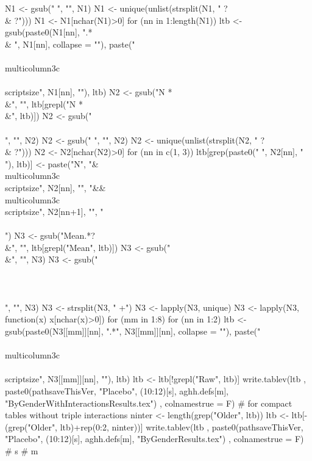 \begin{Schunk}
\begin{Sinput}
{{    N1 <- gsub(" ", "", N1)
    N1 <- unique(unlist(strsplit(N1, " ?\\& ?")))
    N1 <- N1[nchar(N1)>0]
    for (nn in 1:length(N1)) 
      ltb <- gsub(paste0(N1[nn], ".*\\& ", N1[nn], collapse = ""), 
        paste("\\\\multicolumn{3}{c}{\\\\scriptsize", N1[nn], "}"), ltb)
    N2 <- gsub("N *\\&", "", ltb[grepl("N *\\&", ltb)])
    N2 <- gsub("\\\\", "", N2)
    N2 <- gsub(" ", "", N2)
    N2 <- unique(unlist(strsplit(N2, " ?\\& ?")))
    N2 <- N2[nchar(N2)>0]
    for (nn in c(1, 3)) 
      ltb[grep(paste0(" ", N2[nn], " "), ltb)] <- 
        paste("N", "& \\multicolumn{3}{c}{\\scriptsize",  N2[nn], "}",
           "&& \\multicolumn{3}{c}{\\scriptsize",  N2[nn+1], "}", "\\\\")
    N3 <- gsub("Mean.*?\\&", "", ltb[grepl("Mean", ltb)])
    N3 <- gsub("\\&", "", N3)
    N3 <- gsub("\\\\\\\\", "", N3)
    N3 <- strsplit(N3, " +")
    N3 <- lapply(N3, unique)
    N3 <- lapply(N3, function(x) x[nchar(x)>0])
    for (mm in 1:8)
      for (nn in 1:2) 
        ltb <- gsub(paste0(N3[[mm]][nn], ".*", N3[[mm]][nn], collapse = ""), 
          paste("\\\\multicolumn{3}{c}{\\\\scriptsize", N3[[mm]][nn], "}"), ltb)
    ltb <- ltb[!grepl("Raw", ltb)]
    write.tablev(ltb
      ,  paste0(pathsaveThisVer, "Placebo", (10:12)[s], aghh.defs[m], "ByGenderWithInteractionsResults.tex")
      ,  colnamestrue = F)
    # for compact tables without triple interactions
    ninter <- length(grep("Older", ltb))
    ltb <- ltb[-(grep("Older", ltb)+rep(0:2, ninter))]
    write.tablev(ltb
      ,  paste0(pathsaveThisVer, "Placebo", (10:12)[s], aghh.defs[m], "ByGenderResults.tex")
      ,  colnamestrue = F)
  } # s
}  # m
\end{Sinput}
\end{Schunk}

